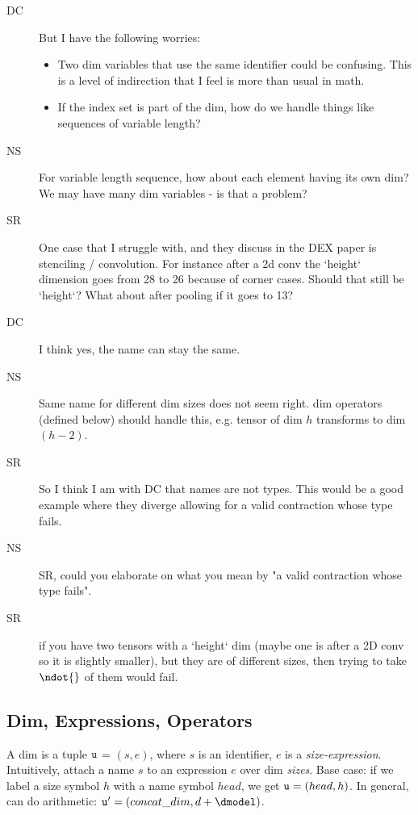 \begin{description}
\item[DC] But I have the following worries:
\begin{itemize}
\item Two dim variables that use the same identifier could be confusing. This is a level of indirection that I feel is more than usual in math.
\item If the index set is part of the dim, how do we handle things like sequences of variable length?
\end{itemize}
\item[NS] For variable length sequence, how about each element having its own dim? We may have many dim variables - is that a problem?
\item[SR] One case that I struggle with, and they discuss in the DEX paper is stenciling / convolution. For instance after a 2d conv the `height` dimension goes from 28 to 26 because of corner cases. Should that still be `height`? What about after pooling if it goes to 13?
\item[DC] I think yes, the name can stay the same.
\item[NS] Same name for different dim sizes does not seem right. dim operators (defined below) should handle this, e.g. tensor of dim $h$ transforms to dim $(h - 2)$.
\item[SR] So I think I am with DC that names are not types. This would be a good example where they diverge allowing for a valid contraction whose type fails. 
\item[NS] SR, could you elaborate on what you mean by "a valid contraction whose type fails". 
\item[SR] if you have two tensors with a `height` dim (maybe one is after a 2D conv so it is slightly smaller), but they are of different sizes, then trying to take $\ndot{}$ of them would fail.  
\end{description}

\subsection*{Dim, Expressions, Operators}
\newcommand{\binop}{\star} %
\newcommand{\opmult}[1]{\underset{#1}{\odot}}
\newcommand{\ndim}[1]{{\tt #1}}
\newcommand{\dimset}{{\mathcal D}}

A dim is a tuple $\ndim{u}$ = $(s, e)$, where $s$ is an identifier, $e$ is a {\it size-expression}. Intuitively, attach a name $s$ to an expression $e$ over dim {\it sizes}. Base case: if we label a size symbol $h$ with a name symbol $head$, we get $\ndim{u} = (head, h)$. 
In general, can do arithmetic: $\ndim{u'} = (concat\_dim, d + \dmodel)$.

